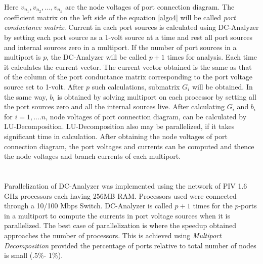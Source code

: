 \documentclass[10pt,psfig,letterpaper,twocolumn]{article}
\begin{document}
Here $v_{n_{1}}, v_{n_{2}}, ..., v_{n_{k}}$ are the node voltages of port connection diagram. The coefficient matrix on the left
side of the equation \ref{algo4} will be called {\it port conductance matrix}.
Current in each port sources is calculated using DC-Analyzer by setting each port 
source as a 1-volt source at a time and rest all port sources and internal sources zero in a multiport.
If the number of port sources in a multiport is $p$, the DC-Analyzer will be called $p+1$ times for
analysis. Each time it calculates the current vector. The current vector obtained is the same as that of the 
column of the port conductance matrix corresponding to  the port voltage source set to 1-volt. After $p$ such calculations, submatrix $G_{i}$
will be obtained. In the same way, $b_{i}$ is obtained by solving multiport on each processor by setting 
all the port sources zero and all the internal sources live. After calculating $G_{i}$ and $b_{i}$ 
for $i=1,....n$, node voltages of port connection diagram, can be calculated by LU-Decomposition. 
LU-Decomposition \cite{Golub,DON} also may be parallelized, if it takes significant time in calculation. 
After obtaining the node voltages of port connection diagram, the port voltages
and currents can be computed and thence the node voltages and branch currents of 
each multiport.

\section*{}

Parallelization of DC-Analyzer was implemented using the network of PIV 1.6 GHz processors each having 
256MB RAM. Processors used were connected through a 10/100 Mbps Switch. 
DC-Analyzer is called $p+1$ times for the $p$-ports in a multiport to compute the currents in port voltage
sources when it is parallelized. 
The best case of parallelization is where the speedup obtained approaches the number of processors. This is achieved 
using {\it Multiport Decomposition} provided the percentage of ports relative to total number of nodes is small 
(.5$\%$- 1$\%$).\par
\end{document}
